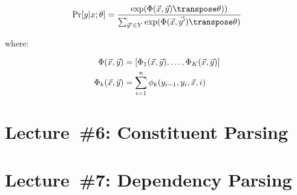 \documentclass[9pt]{extarticle}
\begin{document}
\begin{multicols}{3}
  \subsection*{}

  \begin{equation*}
    \Pr[y\vert x ; \theta] = \frac{\exp(\Phi(\vec{x},\vec{y})\transpose\theta))}{\sum_{\vec{y}' \in Y} \exp(\Phi(\vec{x}, \vec{y'})\transpose\theta)}
  \end{equation*}

  where:

  \begin{align*}
      \Phi(\vec{x},\vec{y}) &= \lbrack\Phi_{1}(\vec{x},\vec{y}),\ldots,\Phi_{K}(\vec{x},\vec{y})\rbrack \\
      \Phi_{k}(\vec{x},\vec{y}) &= \sum_{i=1}^{n} \phi_{k}(y_{i-1},y_{i},\vec{x},i)
  \end{align*}


  \section*{Lecture~\#6: Constituent Parsing}
  \section*{Lecture~\#7: Dependency Parsing}

\end{multicols}
\end{document}
